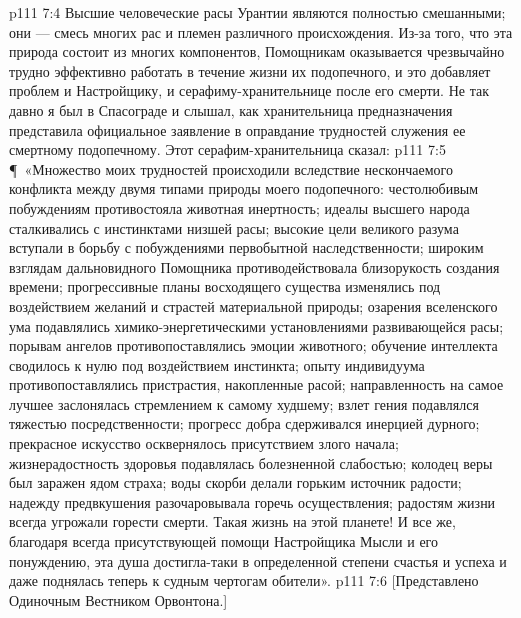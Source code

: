 \vs p111 7:4 Высшие человеческие расы Урантии являются полностью смешанными; они --- смесь многих рас и племен различного происхождения. Из\hyp{}за того, что эта природа состоит из многих компонентов, Помощникам оказывается чрезвычайно трудно эффективно работать в течение жизни их подопечного, и это добавляет проблем и Настройщику, и серафиму\hyp{}хранительнице после его смерти. Не так давно я был в Спасограде и слышал, как хранительница предназначения представила официальное заявление в оправдание трудностей служения ее смертному подопечному. Этот серафим\hyp{}хранительница сказал:
\vs p111 7:5 \P\ «Множество моих трудностей происходили вследствие нескончаемого конфликта между двумя типами природы моего подопечного: честолюбивым побуждениям противостояла животная инертность; идеалы высшего народа сталкивались с инстинктами низшей расы; высокие цели великого разума вступали в борьбу с побуждениями первобытной наследственности; широким взглядам дальновидного Помощника противодействовала близорукость создания времени; прогрессивные планы восходящего существа изменялись под воздействием желаний и страстей материальной природы; озарения вселенского ума подавлялись химико\hyp{}энергетическими установлениями развивающейся расы; порывам ангелов противопоставлялись эмоции животного; обучение интеллекта сводилось к нулю под воздействием инстинкта; опыту индивидуума противопоставлялись пристрастия, накопленные расой; направленность на самое лучшее заслонялась стремлением к самому худшему; взлет гения подавлялся тяжестью посредственности; прогресс добра сдерживался инерцией дурного; прекрасное искусство осквернялось присутствием злого начала; жизнерадостность здоровья подавлялась болезненной слабостью; колодец веры был заражен ядом страха; воды скорби делали горьким источник радости; надежду предвкушения разочаровывала горечь осуществления; радостям жизни всегда угрожали горести смерти. Такая жизнь на этой планете! И все же, благодаря всегда присутствующей помощи Настройщика Мысли и его понуждению, эта душа достигла\hyp{}таки в определенной степени счастья и успеха и даже поднялась теперь к судным чертогам обители».
\vs p111 7:6 [Представлено Одиночным Вестником Орвонтона.]
